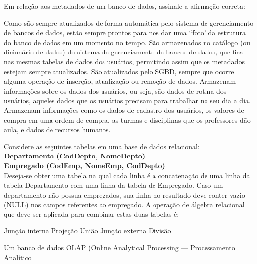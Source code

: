 \documentclass[12pt, addpoints]{exam}
\begin{document}
    \begin{questions}

    \newpage
    \question

Em relação aos metadados de um banco de dados, assinale a afirmação correta:
\begin{choices}
\choice Como são sempre atualizados de forma automática pelo sistema de gerenciamento de bancos de dados, estão sempre prontos para nos dar uma ``foto' da estrutura do banco de dados em um momento no tempo.
\choice São armazenados no catálogo (ou dicionário de dados) do sistema de gerenciamento de bancos de dados, que fica nas mesmas tabelas de dados dos usuários, permitindo assim que os metadados estejam sempre atualizados.
\choice São atualizados pelo SGBD, sempre que ocorre alguma operação de inserção, atualização ou remoção de dados.
\choice Armazenam informações sobre os dados dos usuários, ou seja, são dados de rotina dos usuários, aqueles dados que os usuários precisam para trabalhar no seu dia a dia.
\choice Armazenam informações como os dados de cadastro dos usuários, os valores de compra em uma ordem de compra, as turmas e disciplinas que os professores dão aula, e dados de recursos humanos.
\end{choices}

\question

Considere as seguintes tabelas em uma base de dados relacional:\\

\textbf{Departamento (CodDepto, NomeDepto)}\\

\textbf{Empregado (CodEmp, NomeEmp, CodDepto)}\\

Deseja-se obter uma tabela na qual cada linha é a concatenação de uma linha da tabela Departamento com uma linha da tabela de Empregado. Caso um departamento não possua empregados, sua linha no resultado deve conter vazio (NULL) nos campos referentes ao empregado. A operação de álgebra relacional que deve ser aplicada para combinar estas duas tabelas é:
\begin{choices}
\choice Junção interna
\choice Projeção
\choice União
\choice Junção externa
\choice Divisão
\end{choices}

\question

Um banco de dados OLAP (Online Analytical Processing --- Processamento Analítico


\end{questions}
\end{document}
